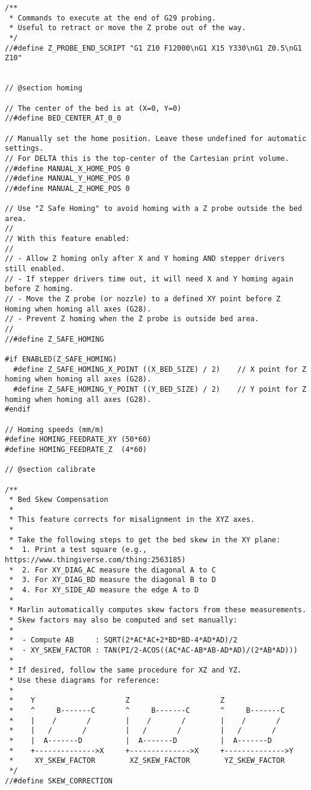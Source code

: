 \begin{lstlisting}[caption = キャプション, label = ラベル]
/**
 * Commands to execute at the end of G29 probing.
 * Useful to retract or move the Z probe out of the way.
 */
//#define Z_PROBE_END_SCRIPT "G1 Z10 F12000\nG1 X15 Y330\nG1 Z0.5\nG1 Z10"


// @section homing

// The center of the bed is at (X=0, Y=0)
//#define BED_CENTER_AT_0_0

// Manually set the home position. Leave these undefined for automatic settings.
// For DELTA this is the top-center of the Cartesian print volume.
//#define MANUAL_X_HOME_POS 0
//#define MANUAL_Y_HOME_POS 0
//#define MANUAL_Z_HOME_POS 0

// Use "Z Safe Homing" to avoid homing with a Z probe outside the bed area.
//
// With this feature enabled:
//
// - Allow Z homing only after X and Y homing AND stepper drivers still enabled.
// - If stepper drivers time out, it will need X and Y homing again before Z homing.
// - Move the Z probe (or nozzle) to a defined XY point before Z Homing when homing all axes (G28).
// - Prevent Z homing when the Z probe is outside bed area.
//
//#define Z_SAFE_HOMING

#if ENABLED(Z_SAFE_HOMING)
  #define Z_SAFE_HOMING_X_POINT ((X_BED_SIZE) / 2)    // X point for Z homing when homing all axes (G28).
  #define Z_SAFE_HOMING_Y_POINT ((Y_BED_SIZE) / 2)    // Y point for Z homing when homing all axes (G28).
#endif

// Homing speeds (mm/m)
#define HOMING_FEEDRATE_XY (50*60)
#define HOMING_FEEDRATE_Z  (4*60)

// @section calibrate

/**
 * Bed Skew Compensation
 *
 * This feature corrects for misalignment in the XYZ axes.
 *
 * Take the following steps to get the bed skew in the XY plane:
 *  1. Print a test square (e.g., https://www.thingiverse.com/thing:2563185)
 *  2. For XY_DIAG_AC measure the diagonal A to C
 *  3. For XY_DIAG_BD measure the diagonal B to D
 *  4. For XY_SIDE_AD measure the edge A to D
 *
 * Marlin automatically computes skew factors from these measurements.
 * Skew factors may also be computed and set manually:
 *
 *  - Compute AB     : SQRT(2*AC*AC+2*BD*BD-4*AD*AD)/2
 *  - XY_SKEW_FACTOR : TAN(PI/2-ACOS((AC*AC-AB*AB-AD*AD)/(2*AB*AD)))
 *
 * If desired, follow the same procedure for XZ and YZ.
 * Use these diagrams for reference:
 *
 *    Y                     Z                     Z
 *    ^     B-------C       ^     B-------C       ^     B-------C
 *    |    /       /        |    /       /        |    /       /
 *    |   /       /         |   /       /         |   /       /
 *    |  A-------D          |  A-------D          |  A-------D
 *    +-------------->X     +-------------->X     +-------------->Y
 *     XY_SKEW_FACTOR        XZ_SKEW_FACTOR        YZ_SKEW_FACTOR
 */
//#define SKEW_CORRECTION


\end{lstlisting}
